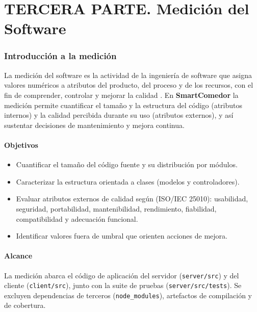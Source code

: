 \part*{TERCERA PARTE. Medición del Software}

\section{Introducción a la medición}
La medición del software es la actividad de la ingeniería de software que asigna
valores numéricos a atributos del producto, del proceso y de los recursos, con el fin
de comprender, controlar y mejorar la calidad \parencite{pressman2014,iso25010}. En
\textbf{SmartComedor} la medición permite cuantificar el tamaño y la estructura del
código (atributos internos) y la calidad percibida durante su uso (atributos externos),
y así sustentar decisiones de mantenimiento y mejora continua.

\subsection{Objetivos}
\begin{itemize}[leftmargin=1.4em]
  \item Cuantificar el tamaño del código fuente y su distribución por módulos.
  \item Caracterizar la estructura orientada a clases (modelos y controladores).
  \item Evaluar atributos externos de calidad según \textcite{iso25010}
        (ISO/IEC 25010): usabilidad, seguridad, portabilidad, mantenibilidad,
        rendimiento, fiabilidad, compatibilidad y adecuación funcional.
  \item Identificar valores fuera de umbral que orienten acciones de mejora.
\end{itemize}

\subsection{Alcance}
La medición abarca el código de aplicación del servidor
(\texttt{server/src}) y del cliente (\texttt{client/src}), junto con la suite de
pruebas (\texttt{server/src/tests}). Se excluyen dependencias de terceros
(\texttt{node\_modules}), artefactos de compilación y de cobertura.

